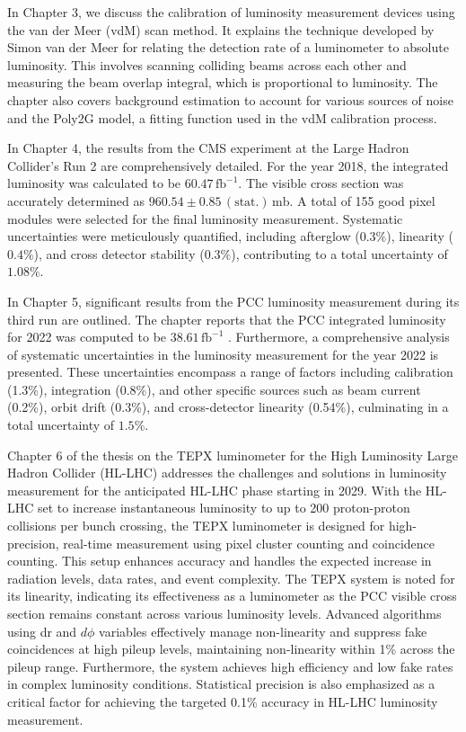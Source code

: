 In Chapter 3, we discuss the calibration of luminosity measurement devices using the van der Meer (vdM) scan method. It explains the technique developed by Simon van der Meer for relating the detection rate of a luminometer to absolute luminosity. This involves scanning colliding beams across each other and measuring the beam overlap integral, which is proportional to luminosity. The chapter also covers background estimation to account for various sources of noise and the Poly2G model, a fitting function used in the vdM calibration process.

In Chapter 4, the results from the CMS experiment at the Large Hadron Collider's Run 2 are comprehensively detailed. For the year 2018, the integrated luminosity was calculated to be \(60.47 \, \text{fb}^{-1}\). The visible cross section was accurately determined as \(960.54 \pm 0.85 \, (\text{stat.}) \, \text{mb}\). A total of 155 good pixel modules were selected for the final luminosity measurement. Systematic uncertainties were meticulously quantified, including afterglow (\(0.3\%\)), linearity (\(0.4\%\)), and cross detector stability (\(0.3\%\)), contributing to a total uncertainty of \(1.08\%\). 

In Chapter 5, significant results from the PCC luminosity measurement during its third run are outlined. The chapter reports that the PCC integrated luminosity for 2022 was computed to be \(38.61 \, \text{fb}^{-1}\) . Furthermore, a comprehensive analysis of systematic uncertainties in the luminosity measurement for the year 2022 is presented. These uncertainties encompass a range of factors including calibration (1.3\%), integration (0.8\%), and other specific sources such as beam current (0.2\%), orbit drift (0.3\%), and cross-detector linearity (0.54\%), culminating in a total uncertainty of \(1.5\%\). 

Chapter 6 of the thesis on the TEPX luminometer for the High Luminosity Large Hadron Collider (HL-LHC) addresses the challenges and solutions in luminosity measurement for the anticipated HL-LHC phase starting in 2029. With the HL-LHC set to increase instantaneous luminosity to up to 200 proton-proton collisions per bunch crossing, the TEPX luminometer is designed for high-precision, real-time measurement using pixel cluster counting and coincidence counting. This setup enhances accuracy and handles the expected increase in radiation levels, data rates, and event complexity. The TEPX system is noted for its linearity, indicating its effectiveness as a luminometer as the PCC visible cross section remains constant across various luminosity levels. Advanced algorithms using dr and $d\phi$ variables effectively manage non-linearity and suppress fake coincidences at high pileup levels, maintaining non-linearity within 1\% across the pileup range. Furthermore, the system achieves high efficiency and low fake rates in complex luminosity conditions. Statistical precision is also emphasized as a critical factor for achieving the targeted 0.1\% accuracy in HL-LHC luminosity measurement.


